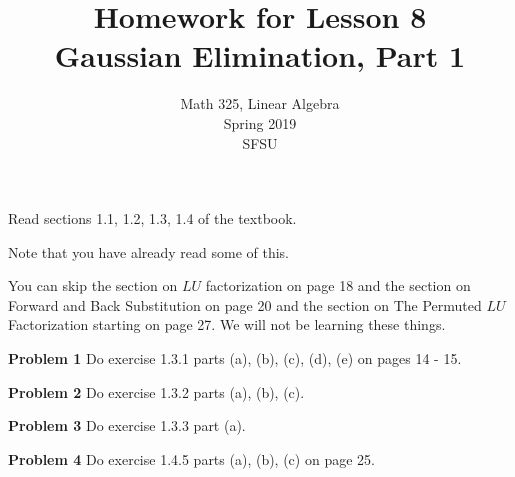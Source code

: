 \documentclass[oneside,12pt]{amsart}
\begin{document}
\title{Homework for Lesson 8 \\ Gaussian Elimination, Part 1}
\author{Math 325, Linear Algebra \\ Spring 2019\\ SFSU }
\date{}

\maketitle

Read sections 1.1, 1.2, 1.3, 1.4 of the textbook.

Note that you have already read some of this.

You can skip the section on $LU$ factorization on page 18 and the
section on Forward and Back Substitution on page 20 and the section on The
Permuted $LU$ Factorization starting on page 27. We will not be learning these things.

\textbf{Problem 1} Do exercise 1.3.1 parts (a), (b), (c), (d), (e)
on pages 14 - 15.

\bigskip
\bigskip

\textbf{Problem 2} Do exercise 1.3.2 parts (a), (b), (c).

\bigskip
\bigskip


\textbf{Problem 3} Do exercise 1.3.3 part (a).

\bigskip
\bigskip

\textbf{Problem 4} Do exercise 1.4.5 parts (a), (b), (c) on page 25.
\end{document}
